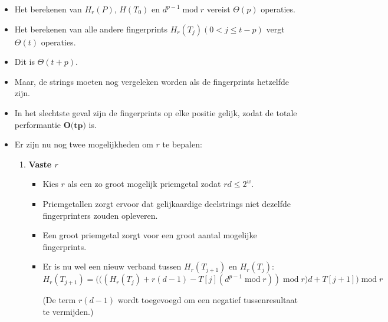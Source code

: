 \begin{itemize}
\begin{itemize}
       
    \end{itemize}
        

        \item Het berekenen van $H_r(P)$, $H(T_0)$ en $d^{p-1}\;\mathrm{mod}\;r$ vereist $\Theta(p)$ operaties.
        \item Het berekenen van alle andere fingerprints $H_r(T_j) (0 < j \leq t - p)$ vergt $\Theta(t)$ operaties.
        \item Dit is $\Theta(t + p)$.
        \item Maar, de strings moeten nog vergeleken worden als de fingerprints hetzelfde zijn.
        \item In het slechtste geval zijn de fingerprints op elke positie gelijk, zodat de totale performantie $\textbf{O(tp)}$ is.
        \item Er zijn nu nog twee mogelijkheden om $r$ te bepalen:
        \begin{enumerate}
            \item \textbf{Vaste $r$}
            \begin{itemize}
                \item Kies $r$ als een zo groot mogelijk priemgetal zodat $rd \leq 2^w$.
                \item Priemgetallen zorgt ervoor dat gelijkaardige deelstrings niet dezelfde fingerprinters zouden opleveren.
                \item Een groot priemgetal zorgt voor een groot aantal mogelijke fingerprints.
                \item Er is nu wel een nieuw verband tussen $H_r(T_{j + 1})$ en $H_r(T_j)$:
                $$H_r(T_{j + 1}) = \bigg(\big((H_r(T_j) + r(d - 1) - T[j](d^{p-1}\;\mathrm{mod}\;r)) \;\mathrm{mod}\;r\big)d + T[j + 1] \bigg)\;\mathrm{mod}\;r$$
                
                (De term $r(d - 1)$ wordt toegevoegd om een negatief tussenresultaat te vermijden.)
            \end{itemize}



\end{enumerate}
\end{itemize}

